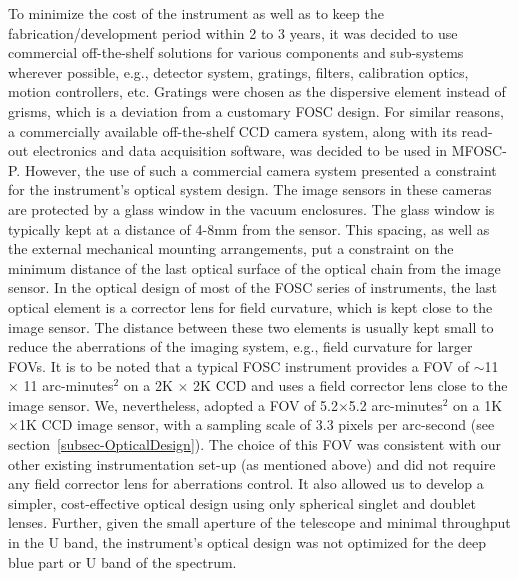 To minimize the cost of the instrument as well as to keep the fabrication/development period within 2 to 3 years, it was decided to use commercial off-the-shelf solutions for various components and sub-systems wherever possible, e.g., detector system, gratings, filters, calibration optics, motion controllers, etc. Gratings were chosen as the dispersive element instead of grisms, which is a deviation from a customary FOSC design. For similar reasons, a commercially available off-the-shelf CCD camera system, along with its read-out electronics and data acquisition software, was decided to be used in MFOSC-P. However, the use of such a commercial camera system presented a constraint for the instrument's optical system design. The image sensors in these cameras are protected by a glass window in the vacuum enclosures. The glass window is typically kept at a distance of 4-8mm from the sensor. This spacing, as well as the external mechanical mounting arrangements, put a constraint on the minimum distance of the last optical surface of the optical chain from the image sensor. In the optical design of most of the FOSC series of instruments, the last optical element is a corrector lens for field curvature, which is kept close to the image sensor. The distance between these two elements is usually kept small to reduce the aberrations of the imaging system, e.g., field curvature for larger FOVs. It is to be noted that a typical FOSC instrument provides a FOV of $\sim$11 $\times$ 11 arc-minutes${^2}$ on a 2K $\times$ 2K CCD and uses a field corrector lens close to the image sensor\citep{Gupta2002}. We, nevertheless, adopted a FOV of 5.2$\times$5.2 arc-minutes$^{2}$ on a 1K$\times$1K CCD image sensor, with a sampling scale of 3.3 pixels per arc-second (see section~\ref{subsec-OpticalDesign}). The choice of this FOV was consistent with our other existing instrumentation set-up (as mentioned above) and did not require any field corrector lens for aberrations control. It also allowed us to develop a simpler, cost-effective optical design using only spherical singlet and doublet lenses. Further, given the small aperture of the telescope and minimal throughput in the U band, the instrument's optical design was not optimized for the deep blue part or U band of the spectrum.



